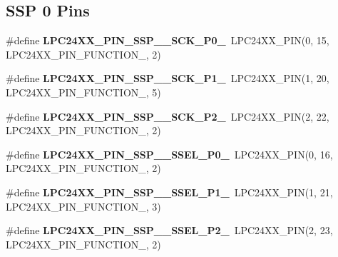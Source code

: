 \subsection*{S\+SP 0 Pins}
\begin{DoxyCompactItemize}
\item 
\mbox{\label{group__lpc24xx__io_ga4d16bf4675709c99b88a7ff4db0980c9}} 
\#define {\bfseries L\+P\+C24\+X\+X\+\_\+\+P\+I\+N\+\_\+\+S\+S\+P\+\_\+\_\+\+S\+C\+K\+\_\+\+P0\+\_}~L\+P\+C24\+X\+X\+\_\+\+P\+IN(0, 15, L\+P\+C24\+X\+X\+\_\+\+P\+I\+N\+\_\+\+F\+U\+N\+C\+T\+I\+O\+N\+\_, 2)
\item 
\mbox{\label{group__lpc24xx__io_ga0b876b037838189d6fd6095fc54e53bb}} 
\#define {\bfseries L\+P\+C24\+X\+X\+\_\+\+P\+I\+N\+\_\+\+S\+S\+P\+\_\+\_\+\+S\+C\+K\+\_\+\+P1\+\_}~L\+P\+C24\+X\+X\+\_\+\+P\+IN(1, 20, L\+P\+C24\+X\+X\+\_\+\+P\+I\+N\+\_\+\+F\+U\+N\+C\+T\+I\+O\+N\+\_, 5)
\item 
\mbox{\label{group__lpc24xx__io_gaf85b8c62a24e38c3986d7bf3b57d60e8}} 
\#define {\bfseries L\+P\+C24\+X\+X\+\_\+\+P\+I\+N\+\_\+\+S\+S\+P\+\_\+\_\+\+S\+C\+K\+\_\+\+P2\+\_}~L\+P\+C24\+X\+X\+\_\+\+P\+IN(2, 22, L\+P\+C24\+X\+X\+\_\+\+P\+I\+N\+\_\+\+F\+U\+N\+C\+T\+I\+O\+N\+\_, 2)
\item 
\mbox{\label{group__lpc24xx__io_ga858030fe32fbe09106b21c8d8595b448}} 
\#define {\bfseries L\+P\+C24\+X\+X\+\_\+\+P\+I\+N\+\_\+\+S\+S\+P\+\_\+\_\+\+S\+S\+E\+L\+\_\+\+P0\+\_}~L\+P\+C24\+X\+X\+\_\+\+P\+IN(0, 16, L\+P\+C24\+X\+X\+\_\+\+P\+I\+N\+\_\+\+F\+U\+N\+C\+T\+I\+O\+N\+\_, 2)
\item 
\mbox{\label{group__lpc24xx__io_gaea79a3396efda3707c35610e4966871c}} 
\#define {\bfseries L\+P\+C24\+X\+X\+\_\+\+P\+I\+N\+\_\+\+S\+S\+P\+\_\+\_\+\+S\+S\+E\+L\+\_\+\+P1\+\_}~L\+P\+C24\+X\+X\+\_\+\+P\+IN(1, 21, L\+P\+C24\+X\+X\+\_\+\+P\+I\+N\+\_\+\+F\+U\+N\+C\+T\+I\+O\+N\+\_, 3)
\item 
\mbox{\label{group__lpc24xx__io_ga3a9b7cc7b2d84dc665fa2f53ed85188b}} 
\#define {\bfseries L\+P\+C24\+X\+X\+\_\+\+P\+I\+N\+\_\+\+S\+S\+P\+\_\+\_\+\+S\+S\+E\+L\+\_\+\+P2\+\_}~L\+P\+C24\+X\+X\+\_\+\+P\+IN(2, 23, L\+P\+C24\+X\+X\+\_\+\+P\+I\+N\+\_\+\+F\+U\+N\+C\+T\+I\+O\+N\+\_, 2)

\end{DoxyCompactItemize}
